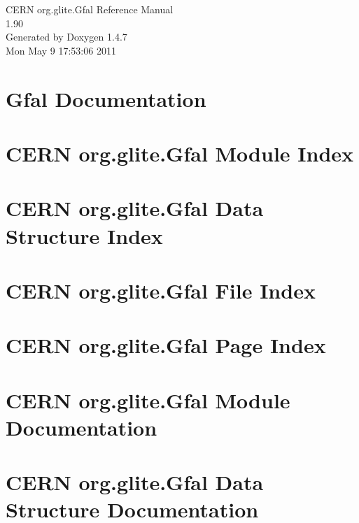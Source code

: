 \documentclass[a4paper]{book}
\begin{document}
\begin{titlepage}
\vspace*{7cm}
\begin{center}
{\Large CERN org.glite.Gfal Reference Manual\\[1ex]\large 1.90 }\\
\vspace*{1cm}
{\large Generated by Doxygen 1.4.7}\\
\vspace*{0.5cm}
{\small Mon May 9 17:53:06 2011}\\
\end{center}
\end{titlepage}
\clearemptydoublepage
{}
\tableofcontents
\clearemptydoublepage
{}
\chapter{Gfal Documentation }
\label{index}
\chapter{CERN org.glite.Gfal Module Index}

\chapter{CERN org.glite.Gfal Data Structure Index}

\chapter{CERN org.glite.Gfal File Index}

\chapter{CERN org.glite.Gfal Page Index}

\chapter{CERN org.glite.Gfal Module Documentation}





\chapter{CERN org.glite.Gfal Data Structure Documentation}




\end{document}
